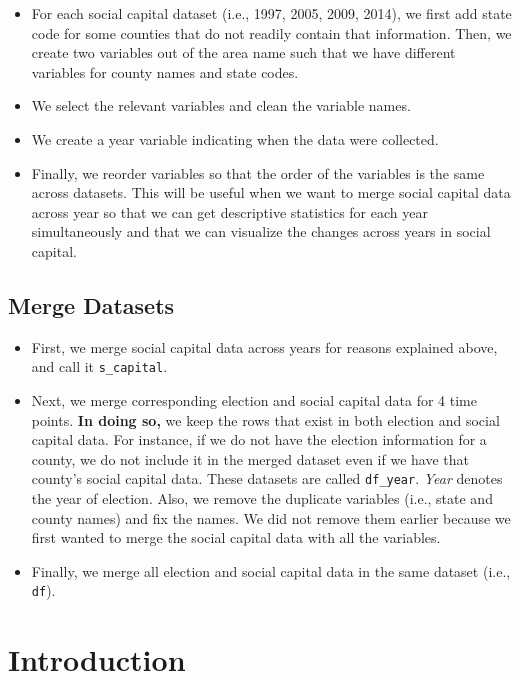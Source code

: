 \documentclass[
  english,
  man]{apa6}
\begin{document}
\begin{itemize}
\item
  For each social capital dataset (i.e., 1997, 2005, 2009, 2014), we first add state code for some counties that do not readily contain that information. Then, we create two variables out of the area name such that we have different variables for county names and state codes.
\item
  We select the relevant variables and clean the variable names.
\item
  We create a year variable indicating when the data were collected.
\item
  Finally, we reorder variables so that the order of the variables is the same across datasets. This will be useful when we want to merge social capital data across year so that we can get descriptive statistics for each year simultaneously and that we can visualize the changes across years in social capital.
\end{itemize}

\hypertarget{merge-datasets}{%
\subsection{Merge Datasets}\label{merge-datasets}}

\begin{itemize}
\item
  First, we merge social capital data across years for reasons explained above, and call it \texttt{s\_capital}.
\item
  Next, we merge corresponding election and social capital data for 4 time points. \textbf{In doing so,} we keep the rows that exist in both election and social capital data. For instance, if we do not have the election information for a county, we do not include it in the merged dataset even if we have that county's social capital data. These datasets are called \texttt{df\_year}. \emph{Year} denotes the year of election. Also, we remove the duplicate variables (i.e., state and county names) and fix the names. We did not remove them earlier because we first wanted to merge the social capital data with all the variables.
\item
  Finally, we merge all election and social capital data in the same dataset (i.e., \texttt{df}).
\end{itemize}

\hypertarget{introduction}{%
\section{Introduction}\label{introduction}}
\end{document}
